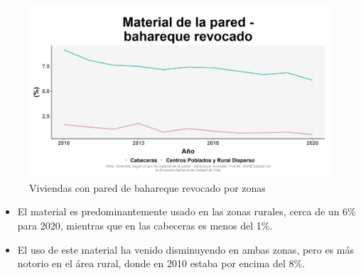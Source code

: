     \begin{figure}[H]
        \caption{Viviendas con pared de bahareque revocado por zonas \label{map_result_2} }
        \begin{center}
        \includegraphics[width=\textwidth,keepaspectratio]{img/var_155_trend.png}
        \end{center}
    \end{figure}
            \begin{itemize}
                    \item El material es predominantemente usado en las zonas rurales, cerca de un 6\% para 2020, mientras que en las cabeceras es menos del 1\%.
                    \item El uso de este material ha venido disminuyendo en ambas zonas, pero es más notorio en el área rural, donde en 2010 estaba por encima del 8\%.
                    \end{itemize}

